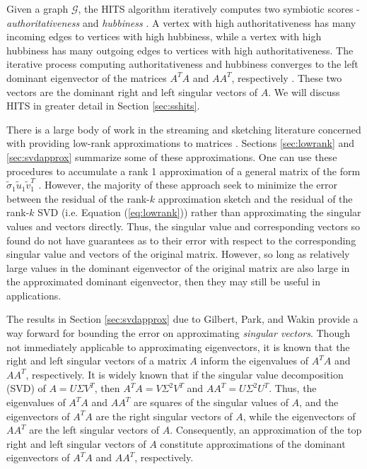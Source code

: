 \documentclass{report}
\begin{document}
Given a graph $\mathcal{G}$, the HITS algorithm iteratively computes two symbiotic scores - \emph{authoritativeness} and \emph{hubbiness} \cite{kleinberg1999authoritative}. 
A vertex with high authoritativeness has many incoming edges to vertices with high hubbiness, while a vertex with high hubbiness has many outgoing edges to vertices with high authoritativeness. 
The iterative process computing authoritativeness and hubbiness converges to the left dominant eigenvector of the matrices $A^TA$ and $AA^T$, respectively \cite{boldi2014axioms}. 
These two vectors are the dominant right and left singular vectors of $A$. 
We will discuss HITS in greater detail in Section \ref{sec:sshits}. 


There is a large body of work in the streaming and sketching literature concerned with providing low-rank approximations to matrices \cite{sarlos2006improved,woodruff2014sketching,clarkson2009numerical,clarkson2017low}.
Sections \ref{sec:lowrank} and \ref{sec:svdapprox} summarize some of these approximations. 
One can use these procedures to accumulate a rank 1 approximation of a general matrix of the form $ \widetilde{\sigma}_1 \widetilde{u}_1 \widetilde{v}_1^T$ \cite{andoni2013eigenvalues}.
However, the majority of these approach seek to minimize the error between the residual of the rank-$k$ approximation sketch and the residual of the rank-$k$ SVD (i.e. Equation (\ref{eq:lowrank})) rather than approximating the singular values and vectors directly.
Thus, the singular value and corresponding vectors so found do not have guarantees as to their error with respect to the corresponding singular value and vectors of the original matrix. 
However, so long as relatively large values in the dominant eigenvector of the original matrix are also large in the approximated dominant eigenvector, then they may still be useful in applications. 

The results in Section \ref{sec:svdapprox} due to Gilbert, Park, and Wakin provide a way forward for bounding the error on approximating \emph{singular vectors}.
Though not immediately applicable to approximating eigenvectors, it is known that the right and left singular vectors of a matrix $A$ inform the eigenvalues of $A^TA$ and $AA^T$, respectively. 
It is widely known that if the singular value decomposition (SVD) of $A = U \Sigma V^T$, then $A^TA = V\Sigma^2 V^T$ and $AA^T = U \Sigma^2 U^T$.
Thus, the eigenvalues of $A^TA$ and $AA^T$ are squares of the singular values of $A$, and the eigenvectors of $A^TA$ are the right singular vectors of $A$, while the eigenvectors of $AA^T$ are the left singular vectors of $A$. 
Consequently, an approximation of the top right and left singular vectors of $A$ constitute approximations of the dominant eigenvectors of $A^TA$ and $AA^T$, respectively. 
\end{document}

